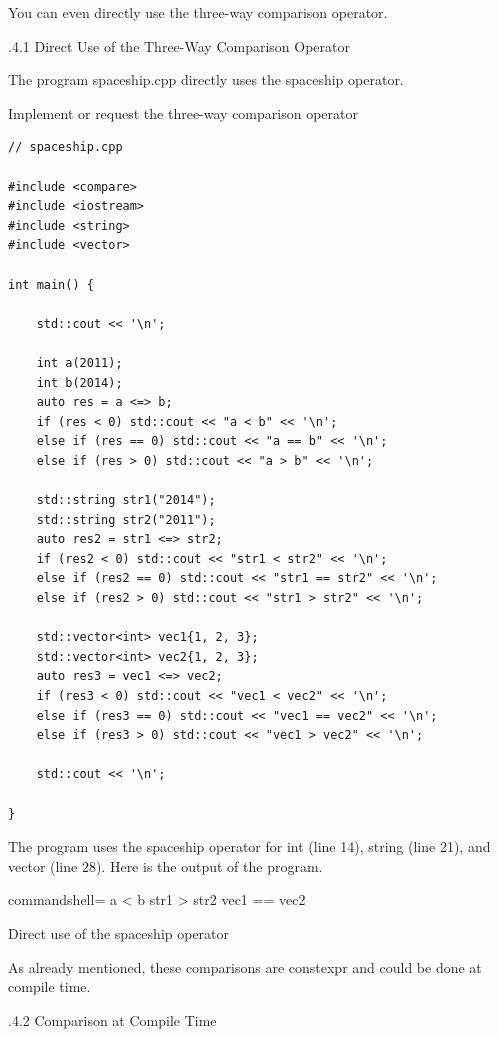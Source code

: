 You can even directly use the three-way comparison operator.

.4.1\hspace{0.2cm} Direct Use of the Three-Way Comparison Operator

The program spaceship.cpp directly uses the spaceship operator.

\noindent
Implement or request the three-way comparison operator
\begin{lstlisting}[style=styleCXX]
// spaceship.cpp

#include <compare>
#include <iostream>
#include <string>
#include <vector>

int main() {
	
	std::cout << '\n';
	
	int a(2011);
	int b(2014);
	auto res = a <=> b;
	if (res < 0) std::cout << "a < b" << '\n';
	else if (res == 0) std::cout << "a == b" << '\n';
	else if (res > 0) std::cout << "a > b" << '\n';
	
	std::string str1("2014");
	std::string str2("2011");
	auto res2 = str1 <=> str2;
	if (res2 < 0) std::cout << "str1 < str2" << '\n';
	else if (res2 == 0) std::cout << "str1 == str2" << '\n';
	else if (res2 > 0) std::cout << "str1 > str2" << '\n';
	
	std::vector<int> vec1{1, 2, 3};
	std::vector<int> vec2{1, 2, 3};
	auto res3 = vec1 <=> vec2;
	if (res3 < 0) std::cout << "vec1 < vec2" << '\n';
	else if (res3 == 0) std::cout << "vec1 == vec2" << '\n';
	else if (res3 > 0) std::cout << "vec1 > vec2" << '\n';
	
	std::cout << '\n';

}
\end{lstlisting}

The program uses the spaceship operator for int (line 14), string (line 21), and vector (line 28). Here is the output of the program.

\begin{tcblisting}{commandshell={}}
a < b
str1 > str2
vec1 == vec2
\end{tcblisting}

\begin{center}
Direct use of the spaceship operator
\end{center}

As already mentioned, these comparisons are constexpr and could be done at compile time.

.4.2\hspace{0.2cm} Comparison at Compile Time

